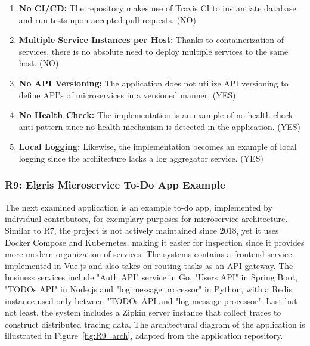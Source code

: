 \documentclass{Configuration_Files/PoliMi3i_thesis}
\begin{document}
\begin{enumerate}
    \item \textbf{No CI/CD:} The repository makes use of Travis CI to instantiate database and run tests upon accepted pull requests. (NO)
    
    \item \textbf{Multiple Service Instances per Host:} Thanks to containerization of services, there is no absolute need to deploy multiple services to the same host. (NO)
    
    \item \textbf{No API Versioning;} The application does not utilize API versioning to define API's of microservices in a versioned manner. (YES)
    
    \item \textbf{No Health Check:} The implementation is an example of no health check anti-pattern since no health mechanism is detected in the application. (YES)
    
    \item \textbf{Local Logging:} Likewise, the implementation becomes an example of local logging since the architecture lacks a log aggregator service. (YES)
\end{enumerate}

\subsubsection{R9: Elgris Microservice To-Do App Example}
\label{subsubsec:R9}

The next examined application is an example to-do app, implemented by individual contributors, for exemplary purposes for microservice architecture.
Similar to R7, the project is not actively maintained since 2018, yet it uses Docker Compose and Kubernetes, making it easier for inspection since it provides more modern organization of services.
The systems contains a frontend service implemented in Vue.js and also takes on routing tasks as an API gateway.
The business services include "Auth API" service in Go, "Users API" in Spring Boot, "TODOs API" in Node.js and "log message processor" in Python, with a Redis instance used only between "TODOs API and "log message processor".
Last but not least, the system includes a Zipkin server instance that collect traces to construct distributed tracing data.
The architectural diagram of the application is illustrated in Figure~\ref{fig:R9_arch}, adapted from the application repository.
\end{document}
